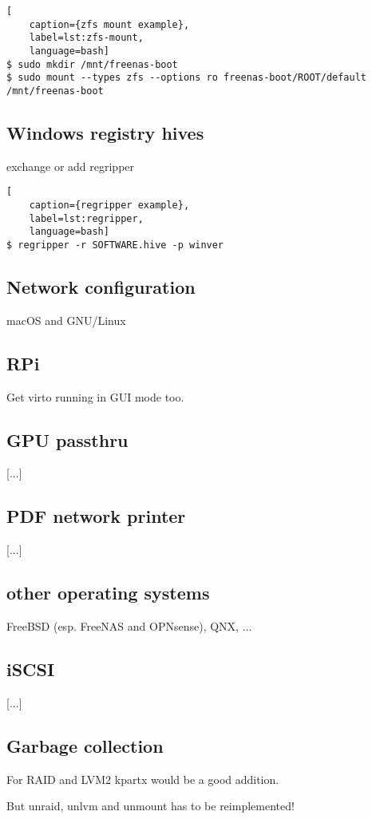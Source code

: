 \begin{lstlisting}[
    caption={zfs mount example},
    label=lst:zfs-mount,
    language=bash]
$ sudo mkdir /mnt/freenas-boot
$ sudo mount --types zfs --options ro freenas-boot/ROOT/default /mnt/freenas-boot
\end{lstlisting}

\subsection{Windows registry hives}

exchange or add regripper

\begin{lstlisting}[
    caption={regripper example},
    label=lst:regripper,
    language=bash]
$ regripper -r SOFTWARE.hive -p winver
\end{lstlisting}

\subsection{Network configuration}

macOS and GNU/Linux

\subsection{RPi}

Get virto running in GUI mode too.

\subsection{GPU passthru}

[...]

\subsection{PDF network printer}

[...]

\subsection{other operating systems}

FreeBSD (esp. FreeNAS and OPNsense), QNX, ...

\subsection{iSCSI}

[...]

\subsection{Garbage collection}

For RAID and LVM2 kpartx would be a good addition.

But unraid, unlvm and unmount has to be reimplemented!